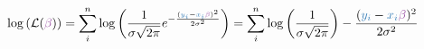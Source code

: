 \documentclass[convert={density=400,outext=.png}]{standalone}
\begin{document}
\pagecolor{almost-white}


$\displaystyle
\log \left(\mathcal{L}({\color[HTML]{984EA3}\beta}) \right) =  \sum_i^n\log \left(\frac{1}{\sigma \sqrt{2\pi}} e^{-\frac{({\color[HTML]{377EB8}y_i} - {\color[HTML]{377EB8}x_i}{\color[HTML]{984EA3}\beta})^2}{2\sigma^2}}\right) = \sum_i^n \log \left(\frac{1}{\sigma \sqrt{2\pi}} \right) - \frac{({\color[HTML]{377EB8}y_i} - {\color[HTML]{377EB8}x_i}{\color[HTML]{984EA3}\beta})^2}{2\sigma^2}
$
\end{document}
